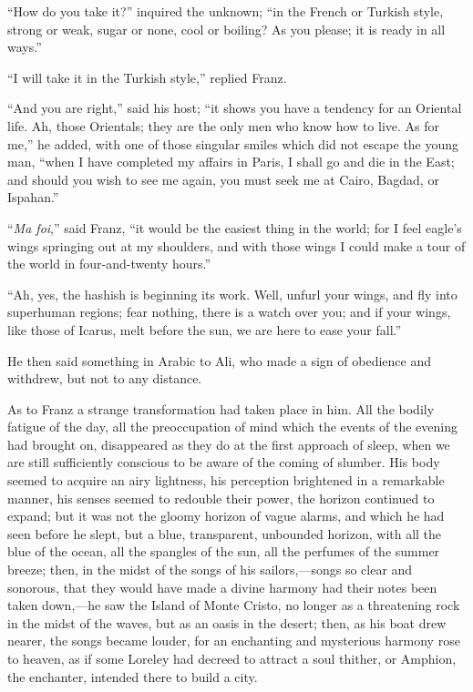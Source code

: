 “How do you take it?” inquired the unknown; “in the French or Turkish
style, strong or weak, sugar or none, cool or boiling? As you please;
it is ready in all ways.”

“I will take it in the Turkish style,” replied Franz.

“And you are right,” said his host; “it shows you have a tendency for
an Oriental life. Ah, those Orientals; they are the only men who know
how to live. As for me,” he added, with one of those singular smiles
which did not escape the young man, “when I have completed my affairs
in Paris, I shall go and die in the East; and should you wish to see me
again, you must seek me at Cairo, Bagdad, or Ispahan.”

“\textit{Ma foi},” said Franz, “it would be the easiest thing in the world;
for I feel eagle’s wings springing out at my shoulders, and with those
wings I could make a tour of the world in four-and-twenty hours.”

“Ah, yes, the hashish is beginning its work. Well, unfurl your wings,
and fly into superhuman regions; fear nothing, there is a watch over
you; and if your wings, like those of Icarus, melt before the sun, we
are here to ease your fall.”

He then said something in Arabic to Ali, who made a sign of obedience
and withdrew, but not to any distance.

As to Franz a strange transformation had taken place in him. All the
bodily fatigue of the day, all the preoccupation of mind which the
events of the evening had brought on, disappeared as they do at the
first approach of sleep, when we are still sufficiently conscious to be
aware of the coming of slumber. His body seemed to acquire an airy
lightness, his perception brightened in a remarkable manner, his senses
seemed to redouble their power, the horizon continued to expand; but it
was not the gloomy horizon of vague alarms, and which he had seen
before he slept, but a blue, transparent, unbounded horizon, with all
the blue of the ocean, all the spangles of the sun, all the perfumes of
the summer breeze; then, in the midst of the songs of his
sailors,—songs so clear and sonorous, that they would have made a
divine harmony had their notes been taken down,—he saw the Island of
Monte Cristo, no longer as a threatening rock in the midst of the
waves, but as an oasis in the desert; then, as his boat drew nearer,
the songs became louder, for an enchanting and mysterious harmony rose
to heaven, as if some Loreley had decreed to attract a soul thither, or
Amphion, the enchanter, intended there to build a city.

